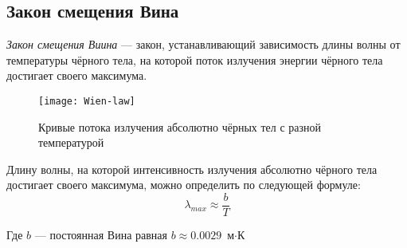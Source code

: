 \subsection{Закон смещения Вина}
\textit{Закон смещения Виина} --- закон, устанавливающий зависимость длины волны от температуры чёрного тела, на которой поток излучения энергии чёрного тела достигает своего максимума.

\begin{figure}[h!]
\begin{center}
\texttt{[image: Wien-law]}
\end{center}
\caption{Кривые потока излучения абсолютно чёрных тел с разной температурой}
\end{figure}

Длину волны, на которой интенсивность излучения абсолютно чёрного тела достигает своего максимума, можно определить по следующей формуле:
\begin{equation}
\lambda_{max}\approx\frac{b}{T}
\end{equation}

Где $b$ --- постоянная Вина равная $b\approx0.0029 $ $\text{м} \cdot \text{К}$
